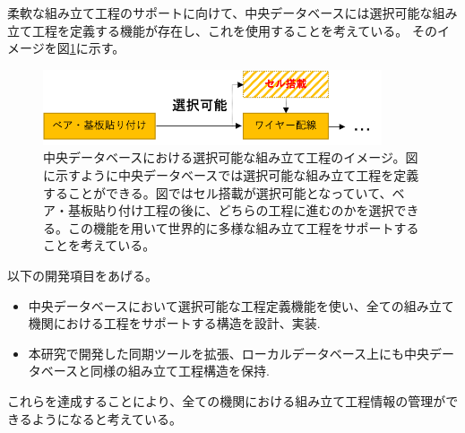 柔軟な組み立て工程のサポートに向けて、中央データベースには選択可能な組み立て工程を定義する機能が存在し、これを使用することを考えている。
そのイメージを図\ref{optional_stage}に示す。

\begin{figure}[bpt]\centering
\includegraphics[width=10cm]{./optional_stage.png}
\caption[中央データベースにおける選択可能な組み立て工程のイメージ]{中央データベースにおける選択可能な組み立て工程のイメージ。図に示すように中央データベースでは選択可能な組み立て工程を定義することができる。図ではセル搭載が選択可能となっていて、ベア・基板貼り付け工程の後に、どちらの工程に進むのかを選択できる。この機能を用いて世界的に多様な組み立て工程をサポートすることを考えている。}
\label{optional_stage}
\end{figure}

以下の開発項目をあげる。
\begin{itemize}
  \item 中央データベースにおいて選択可能な工程定義機能を使い、全ての組み立て機関における工程をサポートする構造を設計、実装.
  \item 本研究で開発した同期ツールを拡張、ローカルデータベース上にも中央データベースと同様の組み立て工程構造を保持.
\end{itemize}

これらを達成することにより、全ての機関における組み立て工程情報の管理ができるようになると考えている。


